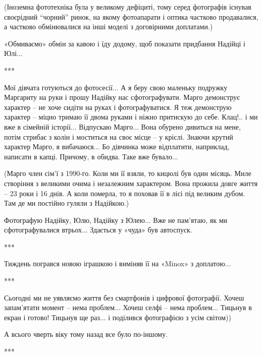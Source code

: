 
(Іноземна фототехніка була у великому дефіциті, тому серед фотографів існував
своєрідний \enquote{чорний} ринок, на якому фотоапарати і оптика частково продавалися,
а частково обмінювалися на інші моделі з договірними доплатами.)

«Обмиваємо» обмін за кавою і їду додому, щоб показати придбання Надійці і
Юлі...


***

Мої дівчата готуються до фотосесії... А я беру свою маленьку подружку Маргариту
на руки і прошу Надійку нас сфотографувати. Марго демонструє характер – не хоче
сидіти на руках і фотографуватися. Я теж демонструю характер – міцно тримаю її
двома руками і ніжно притискую до себе. Клац!.. і ми вже в сімейній історії...
Відпускаю Марго... Вона обурено дивиться на мене, потім стрибає з колін і
моститься на своє місце – у кріслі. Знаючи крутий характер Марго, я
вибачаюся... Бо дівчинка може відплатити, наприклад, написати в капці. Причому,
в обидва. Таке вже бувало...


(Марго член сім’ї з 1990-го. Коли ми її взяли, то кицюлі був один місяць. Миле
створіння з великими очима і незалежним характером. Вона прожила довге життя –
23 роки і 16 днів. А коли померла, то я поховав її в лісі під великим дубом.
Там де ми постійно гуляли з Надійкою.)


Фотографую Надійку, Юлю, Надійку з Юлею... Вже не пам’ятаю, як ми
сфотографувалися втрьох... Здається у «чуда» був автоспуск.

***

Тиждень погрався новою іграшкою і виміняв її на «Minox» з доплатою... 

***

Сьогодні ми не уявляємо життя без смартфонів і цифрової фотографії. Хочеш
запам'ятати момент – нема проблем... Хочеш селфі – нема проблем... Тицьнув в
екран і готово! Тицьнув ще раз... і поділився фотографією з усім світом))

А всього чверть віку тому назад все було по-іншому.

***

